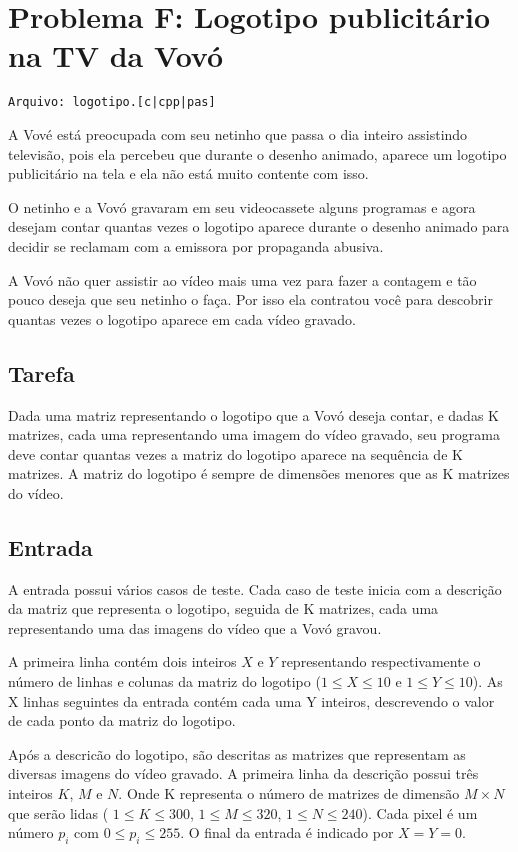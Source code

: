 \section{Problema F: Logotipo publicitário na TV da Vovó}
\vspace{-0.52cm}
\noindent \begin{verbatim}Arquivo: logotipo.[c|cpp|pas]\end{verbatim}

A Vové está preocupada com seu netinho que passa o dia inteiro assistindo televisão, pois ela percebeu que durante o desenho animado, aparece um logotipo publicitário na tela e ela não está muito contente com isso.

O netinho e a Vovó gravaram em seu videocassete alguns programas e agora desejam contar quantas vezes o logotipo aparece durante o desenho animado para decidir se reclamam com a emissora por propaganda abusiva.

A Vovó não quer assistir ao vídeo mais uma vez para fazer a contagem e tão pouco deseja que seu netinho o faça. Por isso ela contratou você para descobrir quantas vezes o logotipo aparece em cada vídeo gravado.

\subsection*{Tarefa}

Dada uma matriz representando o logotipo que a Vovó deseja contar, e dadas K matrizes, cada uma representando uma imagem do vídeo gravado, seu programa deve contar quantas vezes a matriz do logotipo aparece na sequência de K matrizes. A matriz do logotipo é sempre de dimensões menores que as K matrizes do vídeo.

\subsection*{Entrada}
A entrada possui vários casos de teste. Cada caso de teste inicia com a descrição da matriz que representa o logotipo, seguida de K matrizes, cada uma representando uma das imagens do vídeo que a Vovó gravou.

A primeira linha contém dois inteiros $X$ e $Y$ representando respectivamente o número de linhas e colunas da matriz do logotipo ($1 \leq X \leq 10$ e $1 \leq Y \leq 10$). As X linhas seguintes da entrada contém cada uma Y inteiros, descrevendo o valor de cada ponto da matriz do logotipo.

Após a descricão do logotipo, são descritas as matrizes que representam as diversas imagens do vídeo gravado. A primeira linha da descrição possui três inteiros $K$, $M$ e $N$. Onde K representa o número de matrizes de dimensão $M \times N$ que serão lidas ( $1 \leq K \leq 300$, $1 \leq M \leq 320$, $1 \leq N  \leq 240$). Cada pixel é um número $p_i$ com $0 \leq p_i \leq 255$.
O final da entrada é indicado por $X = Y = 0$.


